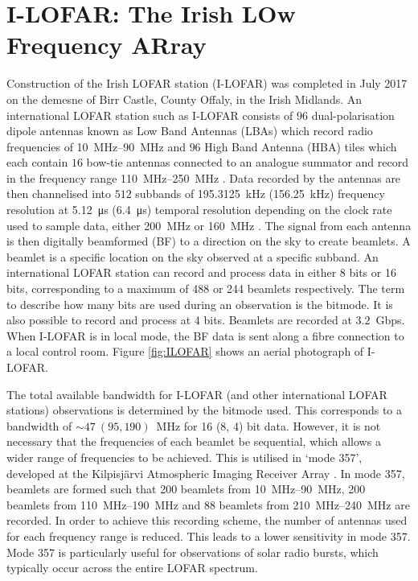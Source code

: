 \section{I-LOFAR: The Irish LOw Frequency ARray}
\label{sec:I-LOFAR}
Construction of the Irish LOFAR station (I-LOFAR) was completed in July 2017 on the demesne of Birr Castle, County Offaly, in the Irish Midlands. An international LOFAR station such as I-LOFAR consists of $96$ dual-polarisation dipole antennas known as Low Band Antennas (LBAs) which record radio frequencies of \SIrange{10}{90}{\mega\hertz} and $96$ High Band Antenna (HBA) tiles which each contain $16$ bow-tie antennas connected to an analogue summator and record in the frequency range \SIrange{110}{250}{\mega\hertz} \citep[see][ for a full description of LOFAR antennas]{VanHaarlem2013}. Data recorded by the antennas are then channelised into $512$ subbands of \SI{195.3125}{\kilo\hertz} (\SI{156.25}{\kilo\hertz}) frequency resolution at \SI{5.12}{\micro\second} (\SI{6.4}{\micro\second}) temporal resolution depending on the clock rate used to sample data, either \SI{200}{\mega \hertz} or \SI{160}{\mega \hertz} \citep{VanHaarlem2013}. The signal from each antenna is then digitally beamformed (BF) to a direction on the sky to create beamlets. A beamlet is a specific location on the sky observed at a specific subband. An international LOFAR station can record and process data in either 8 bits or 16 bits, corresponding to a maximum of 488 or 244 beamlets respectively. The term to describe how many bits are used during an observation is the bitmode. It is also possible to record and process at 4 bits. Beamlets are recorded at $3.2$~Gbps. When I-LOFAR is in local mode, the BF data is sent along a fibre connection to a local control room. Figure \ref{fig:ILOFAR} shows an aerial photograph of I-LOFAR. 

The total available bandwidth for I-LOFAR (and other international LOFAR stations) observations is determined by the bitmode used. This corresponds to a bandwidth of $\sim 47 \ (95, 190)$~MHz for 16 (8, 4) bit data. However, it is not necessary that the frequencies of each beamlet be sequential, which allows  a wider range of frequencies to be achieved. 
This is utilised in `mode 357', developed at the Kilpisjärvi Atmospheric Imaging Receiver Array \citep[KAIRA;][]{McKay-Bukowski2015}. In mode 357, beamlets are formed such that 200 beamlets from \SIrange{10}{90}{\mega\hertz}, 200 beamlets from \SIrange{110}{190}{\mega\hertz} and 88 beamlets from \SIrange{210}{240}{\mega\hertz} are recorded. In order to achieve this recording scheme, the number of antennas used for each frequency range is reduced. This leads to a lower sensitivity in mode 357. Mode 357 is particularly useful for observations of solar radio bursts, which typically occur across the entire LOFAR spectrum.

